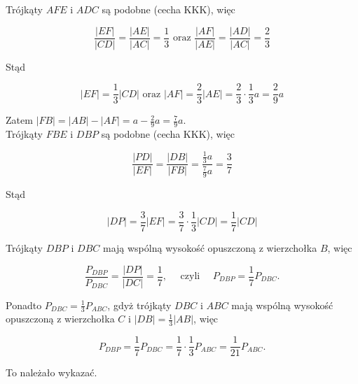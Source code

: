 \documentclass[10pt]{article}
\begin{document}
Trójkąty $A F E$ i $A D C$ są podobne (cecha KKK), więc

$$
\frac{|E F|}{|C D|}=\frac{|A E|}{|A C|}=\frac{1}{3} \text { oraz } \frac{|A F|}{|A E|}=\frac{|A D|}{|A C|}=\frac{2}{3}
$$

Stąd

$$
|E F|=\frac{1}{3}|C D| \text { oraz }|A F|=\frac{2}{3}|A E|=\frac{2}{3} \cdot \frac{1}{3} a=\frac{2}{9} a
$$

Zatem $|F B|=|A B|-|A F|=a-\frac{2}{9} a=\frac{7}{9} a$.\\
Trójkąty $F B E$ i $D B P$ są podobne (cecha KKK), więc

$$
\frac{|P D|}{|E F|}=\frac{|D B|}{|F B|}=\frac{\frac{1}{3} a}{\frac{7}{9} a}=\frac{3}{7}
$$

Stąd

$$
|D P|=\frac{3}{7}|E F|=\frac{3}{7} \cdot \frac{1}{3}|C D|=\frac{1}{7}|C D|
$$

Trójkąty $D B P$ i $D B C$ mają wspólną wysokość opuszczoną z wierzchołka $B$, więc

$$
\frac{P_{D B P}}{P_{D B C}}=\frac{|D P|}{|D C|}=\frac{1}{7}, \quad \text { czyli } \quad P_{D B P}=\frac{1}{7} P_{D B C} .
$$

Ponadto $P_{D B C}=\frac{1}{3} P_{A B C}$, gdyż trójkąty $D B C$ i $A B C$ mają wspólną wysokość opuszczoną z wierzchołka $C$ i $|D B|=\frac{1}{3}|A B|$, więc

$$
P_{D B P}=\frac{1}{7} P_{D B C}=\frac{1}{7} \cdot \frac{1}{3} P_{A B C}=\frac{1}{21} P_{A B C} .
$$

To należało wykazać.
\end{document}
